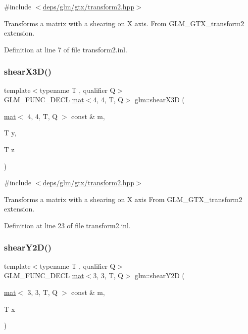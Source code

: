 {\ttfamily \#include $<$\hyperlink{transform2_8hpp}{deps/glm/gtx/transform2.\+hpp}$>$}

Transforms a matrix with a shearing on X axis. From G\+L\+M\+\_\+\+G\+T\+X\+\_\+transform2 extension. 

Definition at line 7 of file transform2.\+inl.

\mbox{\label{group__gtx__transform2_ga73e867c6cd4d700fe2054437e56106c4}} 
\subsubsection{\texorpdfstring{shear\+X3\+D()}{shearX3D()}}
{\footnotesize\ttfamily template$<$typename T , qualifier Q$>$ \\
G\+L\+M\+\_\+\+F\+U\+N\+C\+\_\+\+D\+E\+CL \hyperlink{structglm_1_1mat}{mat}$<$4, 4, T, Q$>$ glm\+::shear\+X3D (\begin{DoxyParamCaption}\item[{\hyperlink{structglm_1_1mat}{mat}$<$ 4, 4, T, Q $>$ const \&}]{m,  }\item[{T}]{y,  }\item[{T}]{z }\end{DoxyParamCaption})}



{\ttfamily \#include $<$\hyperlink{transform2_8hpp}{deps/glm/gtx/transform2.\+hpp}$>$}

Transforms a matrix with a shearing on X axis From G\+L\+M\+\_\+\+G\+T\+X\+\_\+transform2 extension. 

Definition at line 23 of file transform2.\+inl.

\mbox{\label{group__gtx__transform2_gac7998d0763d9181550c77e8af09a182c}} 
\subsubsection{\texorpdfstring{shear\+Y2\+D()}{shearY2D()}}
{\footnotesize\ttfamily template$<$typename T , qualifier Q$>$ \\
G\+L\+M\+\_\+\+F\+U\+N\+C\+\_\+\+D\+E\+CL \hyperlink{structglm_1_1mat}{mat}$<$3, 3, T, Q$>$ glm\+::shear\+Y2D (\begin{DoxyParamCaption}\item[{\hyperlink{structglm_1_1mat}{mat}$<$ 3, 3, T, Q $>$ const \&}]{m,  }\item[{T}]{x }\end{DoxyParamCaption})}



